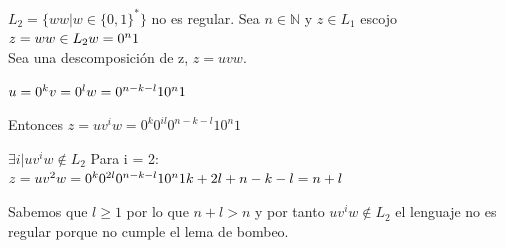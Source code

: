 \documentclass[12pt, spanish]{article}
\begin{document}
\subsection{}

\begin{math}
L_{2} = \{ ww | w \in \{0,1\}^{*} \}
\end{math} no es regular.
Sea \begin{math} n \in \mathbb{N} \end{math} y \begin{math} z \in L_{1} \end{math} escojo \begin{math} z = ww \in L_{2}\\ w= 0^{n}1\end{math}\\

Sea una descomposición de z, \begin{math} z = uvw \end{math}.

\begin{math}
u = 0^{k}\\
v = 0^{l}\\
w = 0^{n-k-l}10^{n}1\\
\end{math}

Entonces \begin{math}
z = uv^{i}w = 0^{k}0^{il}0^{n-k-l}10^{n}1
\end{math}

\begin{math}
\exists i | uv^{i}w \notin L_{2}
\end{math}
Para i = 2:\\
\begin{math}
z = uv^{2}w = 0^{k}0^{2l}0^{n-k-l}10^{n}1\\
k+2l+n-k-l = n+l
\end{math}

Sabemos que \begin{math} l \geq 1 \end{math} por lo que \begin{math} n+l > n \end{math} y por tanto \begin{math}uv^{i}w \notin L_{2}\end{math} el lenguaje no es regular porque no cumple el lema de bombeo.

\subsection{}
\end{document}
